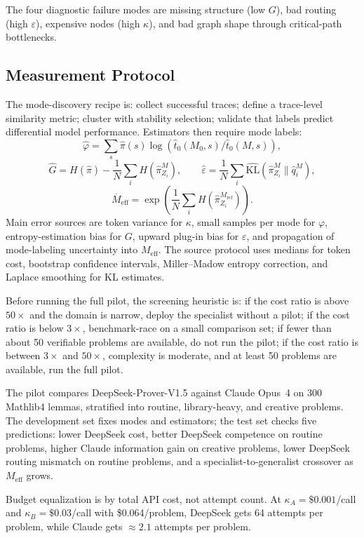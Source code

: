 \documentclass[10pt]{article}
\theoremstyle{paperplain}
\theoremstyle{paperdefinition}
\theoremstyle{paperremark}
\newcommand{\KL}{\mathrm{KL}}
\newcommand{\Meff}{M_{\mathrm{eff}}}
\begin{document}
The four diagnostic failure modes are missing structure (low $G$), bad routing (high $\varepsilon$), expensive nodes (high $\kappa$), and bad graph shape through critical-path bottlenecks.

\subsection{Measurement Protocol}
\label{subsec:mode-discovery}
\label{subsec:estimators}
\label{subsec:pilot}

The mode-discovery recipe is: collect successful traces; define a trace-level similarity metric; cluster with stability selection; validate that labels predict differential model performance. Estimators then require mode labels:
\[
\hat\varphi=\sum_s\hat\pi(s)\log(\hat t_0(M_0,s)/\hat t_0(M,s)),
\]
\[
\hat G=H(\hat\pi)-\frac{1}{N}\sum_i H(\hat\pi_{Z_i}^M),
\qquad
\hat\varepsilon=\frac{1}{N}\sum_i\widehat{\KL}(\hat\pi_{Z_i}^M\|\hat q_i^M),
\]
\[
\overline M_{\mathrm{eff}}=\exp\!\left(\frac{1}{N}\sum_i H(\hat\pi_{Z_i}^{M_{\mathrm{ref}}})\right).
\]
Main error sources are token variance for $\kappa$, small samples per mode for $\varphi$, entropy-estimation bias for $G$, upward plug-in bias for $\varepsilon$, and propagation of mode-labeling uncertainty into $\Meff$. The source protocol uses medians for token cost, bootstrap confidence intervals, Miller--Madow entropy correction, and Laplace smoothing for KL estimates.

Before running the full pilot, the screening heuristic is: if the cost ratio is above $50\times$ and the domain is narrow, deploy the specialist without a pilot; if the cost ratio is below $3\times$, benchmark-race on a small comparison set; if fewer than about 50 verifiable problems are available, do not run the pilot; if the cost ratio is between $3\times$ and $50\times$, complexity is moderate, and at least 50 problems are available, run the full pilot.

The pilot compares DeepSeek-Prover-V1.5 against Claude Opus~4 on 300 Mathlib4 lemmas, stratified into routine, library-heavy, and creative problems. The development set fixes modes and estimators; the test set checks five predictions: lower DeepSeek cost, better DeepSeek competence on routine problems, higher Claude information gain on creative problems, lower DeepSeek routing mismatch on routine problems, and a specialist-to-generalist crossover as $\Meff$ grows.

Budget equalization is by total API cost, not attempt count. At $\kappa_A=\$0.001$/call and $\kappa_B=\$0.03$/call with \$0.064/problem, DeepSeek gets 64 attempts per problem, while Claude gets $\approx 2.1$ attempts per problem.
\end{document}
